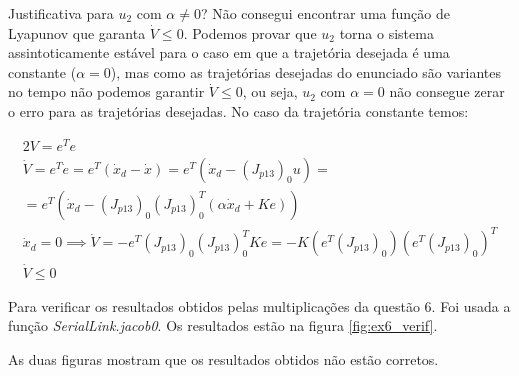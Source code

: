 \documentclass[a4paper,11pt]{article}
\theoremstyle{mytheor}
\begin{document}
Justificativa para $u_{2}$ com $\alpha \neq 0$? Não consegui encontrar uma função de Lyapunov que garanta $\dot{V} \leq 0$. Podemos provar que $u_{2}$ torna o sistema assintoticamente estável para o caso em que a trajetória desejada é uma constante ($\alpha = 0$), mas como as trajetórias desejadas do enunciado são variantes no tempo  não podemos garantir $\dot{V} \leq 0$, ou seja, $u_{2}$ com $\alpha = 0$ não consegue zerar o erro para as trajetórias desejadas. No caso da trajetória constante temos:

\begin{gather*}
2V = e^Te \\
\dot{V} = e^T\dot{e} = e^T(\dot{x}_d - \dot{x}) = e^T(\dot{x}_d - (J_{p13})_0u) = \\ = e^T(\dot{x}_d - (J_{p13})_0(J_{p13})_0^T(\alpha \dot{x}_d + Ke)) \\
\dot{x}_d = 0 \implies \dot{V} = -e^T(J_{p13})_0(J_{p13})_0^TKe = -K(e^T(J_{p13})_0)(e^T(J_{p13})_0)^T \\
\dot{V} \leq 0
\end{gather*}


Para verificar os resultados obtidos pelas multiplicações da questão 6. Foi usada a função \textit{SerialLink.jacob0}. Os resultados estão na figura \ref{fig:ex6_verif}.

As duas figuras mostram que os resultados obtidos não estão corretos.
\end{document}
